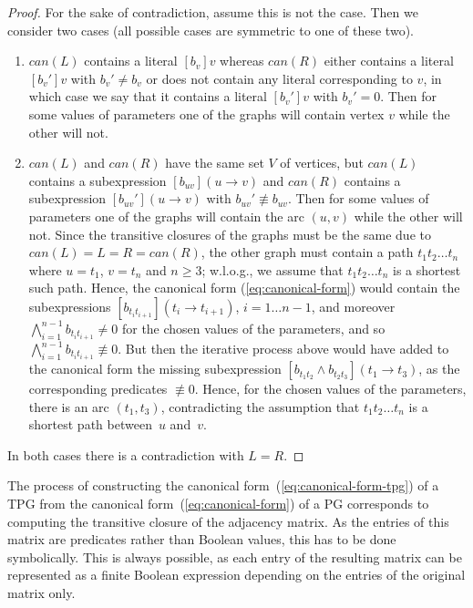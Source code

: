 \begin{proof}
For the sake of contradiction, assume this is not the case. Then we
consider two cases (all possible cases are symmetric to one of these
two).
\begin{enumerate}
\item $\mathit{can}(L)$ contains a literal $[b_{v}]v$ whereas $\mathit{can}(R)$
either contains a literal $[b_{v}']v$ with $b_{v}'\neq b_{v}$ or
does not contain any literal corresponding to $v$, in which case
we say that it contains a literal $[b_{v}']v$ with $b_{v}'=0$. Then
for some values of parameters one of the graphs will contain vertex
$v$ while the other will not.
\item $\mathit{can}(L)$ and $\mathit{can}(R)$ have the same set $V$ of
vertices, but $\mathit{can}(L)$ contains a subexpression \foreignlanguage{english}{$[b_{uv}](u\!\rightarrow\! v)$}
and $\mathit{can}(R)$ contains a subexpression \foreignlanguage{english}{$[b_{uv}'](u\!\rightarrow\! v)$}
with $b_{uv}'\not\equiv b_{uv}$. Then for some values of parameters
one of the graphs will contain the arc $(u,v)$ while the other will
not. Since the transitive closures of the graphs must be the same
due to $\mathit{can}(L)\!=\! L\!=\! R\!=\!\mathit{can}(R)$, the other
graph must contain a path $t_{1}t_{2}\ldots t_{n}$ where $u\!=\! t_{1}$,
$v\!=\! t_{n}$ and $n\!\geq\!3$; w.l.o.g., we assume that $t_{1}t_{2}\ldots t_{n}$
is a shortest such path. Hence, the canonical form (\ref{eq:canonical-form})
would contain the subexpressions $[b_{t_{i}t_{i+1}}](t_{i}\!\rightarrow\! t_{i+1})$,
$i=1\ldots n-1$, and moreover $\bigwedge_{i=1}^{n-1}b_{t_{i}t_{i+1}}\neq0$
for the chosen values of the parameters, and so $\bigwedge_{i=1}^{n-1}b_{t_{i}t_{i+1}}\not\equiv0$.
But then the iterative process above would have added to the canonical
form the missing subexpression $[b_{t_{1}t_{2}}\wedge b_{t_{2}t_{3}}](t_{1}\!\rightarrow\! t_{3})$,
as the corresponding predicates $\not\equiv0$. Hence, for the chosen
values of the parameters, there is an arc $(t_{1},t_{3})$, contradicting
the assumption that $t_{1}t_{2}\ldots t_{n}$ is a shortest path between~$u$
and~$v$.
\end{enumerate}
In both cases there is a contradiction with $L=R$.
\end{proof}
The process of constructing the canonical form~(\ref{eq:canonical-form-tpg})
of a TPG from the canonical form~(\ref{eq:canonical-form}) of a
PG corresponds to computing the transitive closure of the adjacency
matrix. As the entries of this matrix are predicates rather than Boolean
values, this has to be done symbolically. This is always possible,
as each entry of the resulting matrix can be represented as a finite
Boolean expression depending on the entries of the original matrix
only.

